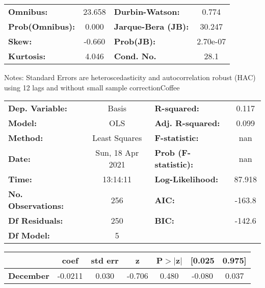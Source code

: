 \begin{center}
\begin{tabular}{lcccccc}
\bottomrule
\end{tabular}
\begin{tabular}{lclc}
\textbf{Omnibus:}       & 23.658 & \textbf{  Durbin-Watson:     } &    0.774  \\
\textbf{Prob(Omnibus):} &  0.000 & \textbf{  Jarque-Bera (JB):  } &   30.247  \\
\textbf{Skew:}          & -0.660 & \textbf{  Prob(JB):          } & 2.70e-07  \\
\textbf{Kurtosis:}      &  4.046 & \textbf{  Cond. No.          } &     28.1  \\
\bottomrule
\end{tabular}
\end{center}

Notes: \newline
 [1] Standard Errors are heteroscedasticity and autocorrelation robust (HAC) using 12 lags and without small sample correctionCoffee\begin{center}
\begin{tabular}{lclc}
\toprule
\textbf{Dep. Variable:}    &      Basis       & \textbf{  R-squared:         } &     0.117   \\
\textbf{Model:}            &       OLS        & \textbf{  Adj. R-squared:    } &     0.099   \\
\textbf{Method:}           &  Least Squares   & \textbf{  F-statistic:       } &       nan   \\
\textbf{Date:}             & Sun, 18 Apr 2021 & \textbf{  Prob (F-statistic):} &      nan    \\
\textbf{Time:}             &     13:14:11     & \textbf{  Log-Likelihood:    } &    87.918   \\
\textbf{No. Observations:} &         256      & \textbf{  AIC:               } &    -163.8   \\
\textbf{Df Residuals:}     &         250      & \textbf{  BIC:               } &    -142.6   \\
\textbf{Df Model:}         &           5      & \textbf{                     } &             \\
\bottomrule
\end{tabular}
\begin{tabular}{lcccccc}
                  & \textbf{coef} & \textbf{std err} & \textbf{z} & \textbf{P$> |$z$|$} & \textbf{[0.025} & \textbf{0.975]}  \\
\midrule
\textbf{December} &      -0.0211  &        0.030     &    -0.706  &         0.480        &       -0.080    &        0.037     \\

\end{tabular}
\end{center}
